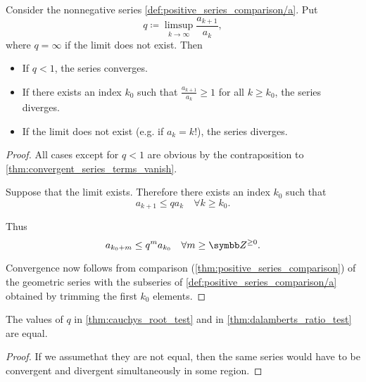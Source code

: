 \begin{proposition}\label{thm:dalamberts_ratio_test}\cite[theorem 3.33]{Rudin1991}
  Consider the nonnegative series \cref{def:positive_series_comparison/a}. Put
  \begin{equation*}
    q \coloneqq \limsup_{k \to \infty} \frac {a_{k+1}} {a_k},
  \end{equation*}
  where \( q = \infty \) if the limit does not exist. Then
  \begin{itemize}
    \item If \( q < 1 \), the series converges.
    \item If there exists an index \( k_0 \) such that \( \frac {a_{k+1}} {a_k} \geq 1 \) for all \( k \geq k_0 \), the series diverges.
    \item If the limit does not exist (e.g. if \( a_k = k! \)), the series diverges.
  \end{itemize}
\end{proposition}
\begin{proof}
  All cases except for \( q < 1 \) are obvious by the contraposition to \cref{thm:convergent_series_terms_vanish}.

  Suppose that the limit exists. Therefore there exists an index \( k_0 \) such that
  \begin{equation*}
    a_{k+1} \leq q a_k \quad\forall k \geq k_0.
  \end{equation*}

  Thus
  \begin{equation*}
    a_{k_0 + m} \leq q^m a_{k_0} \quad\forall m \geq \Z^{\geq 0}.
  \end{equation*}

  Convergence now follows from comparison (\cref{thm:positive_series_comparison}) of the geometric series with the subseries of \cref{def:positive_series_comparison/a} obtained by trimming the first \( k_0 \) elements.
\end{proof}

\begin{proposition}\label{remark:nonnegative_series_convergence_test_equivalence}
  The values of \( q \) in \cref{thm:cauchys_root_test} and in \cref{thm:dalamberts_ratio_test} are equal.
\end{proposition}
\begin{proof}
  If we assume\LEM that they are not equal, then the same series would have to be convergent and divergent simultaneously in some region.
\end{proof}

